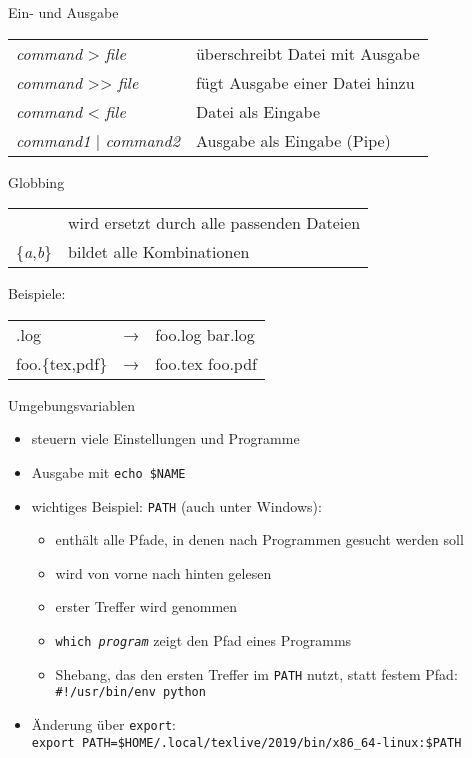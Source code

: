 \begin{frame}{Ein- und Ausgabe}
  \begin{tabu}{>{\ttfamily}l X[,L]}
    \textit{command} > \textit{file}      & überschreibt Datei mit Ausgabe \\
    \textit{command} >> \textit{file}     & fügt Ausgabe einer Datei hinzu \\
    \textit{command} < \textit{file}      & Datei als Eingabe \\
    \textit{command1} | \textit{command2} & Ausgabe als Eingabe (Pipe)
  \end{tabu}
\end{frame}


\begin{frame}{Globbing}
  \begin{tabu}{>{\ttfamily}l X[,L]}
    *                         & wird ersetzt durch alle passenden Dateien \\
    \{\textit{a},\textit{b}\} & bildet alle Kombinationen
  \end{tabu}

  \vspace{2cm}
  Beispiele:\\[10pt]
  \begin{tabu}{>{\ttfamily}l c >{\ttfamily}l}
    *.log           & → & foo.log bar.log \\
    foo.\{tex,pdf\} & → & foo.tex foo.pdf
  \end{tabu}
\end{frame}


\begin{frame}{Umgebungsvariablen}
  \begin{itemize}
    \item steuern viele Einstellungen und Programme
    \item Ausgabe mit \texttt{echo \$NAME}
    \item wichtiges Beispiel: \texttt{PATH} (auch unter Windows):
      \begin{itemize}
        \item enthält alle Pfade, in denen nach Programmen gesucht werden soll
        \item wird von vorne nach hinten gelesen
        \item erster Treffer wird genommen
        \item \texttt{which \textit{program}} zeigt den Pfad eines Programms
        \item Shebang, das den ersten Treffer im \texttt{PATH} nutzt, statt festem Pfad: \texttt{\#!/usr/bin/env python}
      \end{itemize}
    \item Änderung über \texttt{export}:\\
      \texttt{export PATH=\$HOME/.local/texlive/2019/bin/x86\_64-linux:\$PATH}
  \end{itemize} 
\end{frame}

